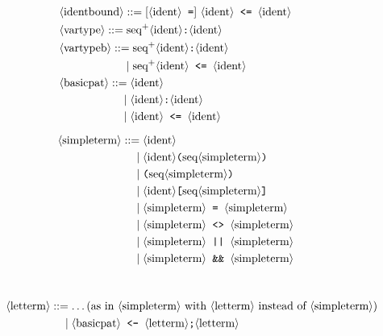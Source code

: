 \begin{figure}
\def\phst{\phantom{\nonterm{simpleterm} = }\mid}
\def\phlt{\phantom{\nonterm{letterm} = }\mid}
\def\pht{\phantom{\nonterm{term} = }\mid}
\def\phpat{\phantom{\nonterm{pattern} = }\mid}
\begin{minipage}{8.5cm}
\begin{align*}
&\nonterm{identbound} ::= [\nonterm{ident}\texttt{ =}]\ \nonterm{ident} \texttt{ <= }\nonterm{ident}\\
&\nonterm{vartype} ::= \neseq{ident} \texttt{:}\nonterm{ident}\\
&\nonterm{vartypeb} ::= \neseq{ident} \texttt{:}\nonterm{ident}\\
&\phantom{\nonterm{vartypeb} =}\mid \neseq{ident} \texttt{ <= }\nonterm{ident}\\
&\nonterm{basicpat} ::= \nonterm{ident}\\
&\phantom{\nonterm{basicpat} =}\mid \nonterm{ident}\texttt{:}\nonterm{ident}\\
&\phantom{\nonterm{basicpat} =}\mid \nonterm{ident}\texttt{ <= }\nonterm{ident}\\[-1mm]
\end{align*}
\end{minipage}
\begin{minipage}{7cm}
\begin{align*}
&\nonterm{simpleterm} ::= \nonterm{ident}\\
&\phst \nonterm{ident}\texttt{(}\seq{simpleterm}\texttt{)}\\
&\phst \texttt{(}\seq{simpleterm}\texttt{)}\\
&\phst \nonterm{ident}\texttt{[}\seq{simpleterm}\texttt{]}\\
&\phst \nonterm{simpleterm} \texttt{ = } \nonterm{simpleterm} \\
&\phst \nonterm{simpleterm} \texttt{ <> } \nonterm{simpleterm} \\
&\phst \nonterm{simpleterm} \texttt{ || } \nonterm{simpleterm} \\
&\phst \nonterm{simpleterm} \texttt{ \&\& } \nonterm{simpleterm} 
\end{align*}
\end{minipage}\\
\begin{align*}
&\nonterm{letterm} ::= \ldots \text{(as in $\nonterm{simpleterm}$ with 
$\nonterm{letterm}$ instead of $\nonterm{simpleterm}$)}\\
&\phlt \nonterm{basicpat} \texttt{ <- } \nonterm{letterm}\texttt{;}\nonterm{letterm}\\

\end{align*}
\end{figure}
